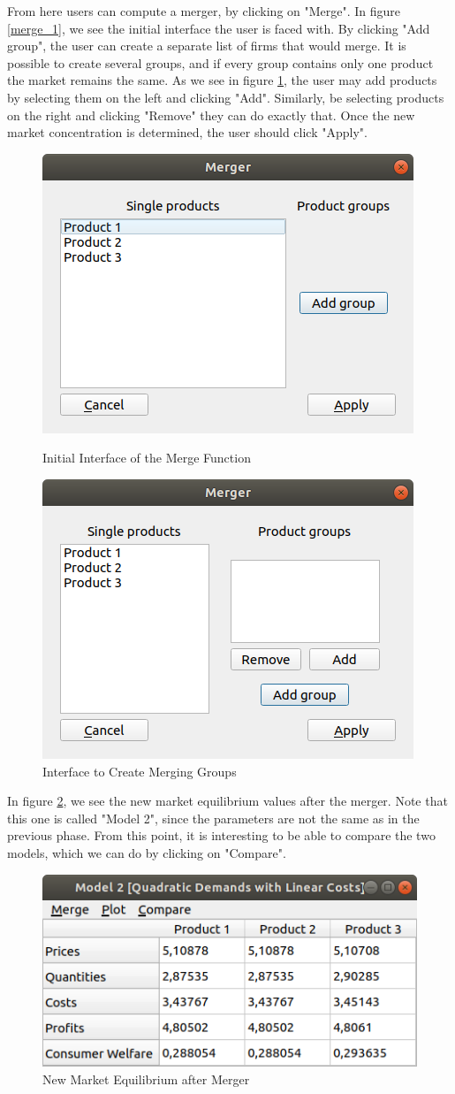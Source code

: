 \documentclass[12pt]{article}
\begin{document}
From here users can compute a merger, by clicking on "Merge". In figure \ref{merge_1}, we see the initial interface the user is faced with. By clicking "Add group", the user can create a separate list of firms that would merge. It is possible to create several groups, and if every group contains only one product the market remains the same. As we see in figure \ref{merge_2}, the user may add products by selecting them on the left and clicking "Add". Similarly, be selecting products on the right and clicking "Remove" they can do exactly that. Once the new market concentration is determined, the user should click "Apply".
\begin{figure}
\begin{center}
\begin{minipage}{2.75in}
  \includegraphics[width=5 cm]{merge_1}
\caption{\label{merge_1} Initial Interface of the Merge Function}
\end{minipage}
\begin{minipage}{2.75in}
 \includegraphics[width=5 cm]{merge_2}
\caption{\label{merge_2} Interface to Create Merging Groups}
\end{minipage}
\end{center}
\end{figure}

In figure \ref{after_merger}, we see the new market equilibrium values after the merger. Note that this one is called "Model 2", since the parameters are not the same as in the previous phase. From this point, it is interesting to be able to compare the two models, which we can do by clicking on "Compare".
\begin{figure}[H]
\begin{center}
  \includegraphics[width=10 cm]{after_merger}
\caption{\label{after_merger} New Market Equilibrium after Merger}
\end{center}
\end{figure}
\end{document}
